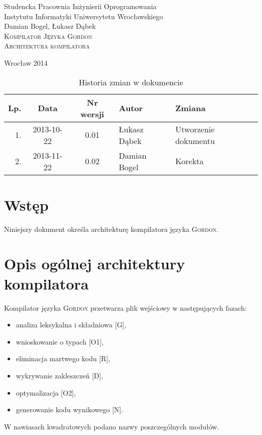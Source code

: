 \documentclass{documentation}
\begin{document}
\begin{titlepage}
\begin{center}
Studencka Pracownia Inżynierii Oprogramowania\\
Instytutu Informatyki Uniwersytetu Wrocławskiego\\[6cm]

Damian Bogel, Łukasz Dąbek\\[1cm]
\textsc{\LARGE Kompilator Języka Gordon}\\[0.5cm]
\textsc{\large Architektura kompilatora}

\vfill
Wrocław 2014 \\[2.5cm]

\end{center}
\end{titlepage}

\newpage
\begin{table}
	\centering
    \captionsetup{name=Tabela,labelsep=period,labelsep=period}
	\caption{Historia zmian w dokumencie}
		\begin{tabular}{|r|c|c|l|l|}
		\hline
		Lp.  & Data       & Nr wersji & Autor                 & Zmiana \\ \hline
		1.   & 2013-10-22 & 0.01 & Łukasz Dąbek & Utworzenie dokumentu \\ \hline
		2.   & 2013-11-22 & 0.02 & Damian Bogel & Korekta \\ \hline
	\end{tabular}
\end{table}
\newpage

\tableofcontents
\setcounter{page}{2}

\newpage

\section{Wstęp}
\noindent Niniejszy dokument określa architekturę kompilatora języka
\textsc{Gordon}.

\section{Opis ogólnej architektury kompilatora}
\noindent Kompilator języka \textsc{Gordon} przetwarza plik wejściowy w
następujących fazach:
\begin{itemize}
    \item analiza leksykalna i składniowa [G],
    \item wnioskowanie o typach [O1],
    \item eliminacja martwego kodu [R],
    \item wykrywanie zakleszczeń [D], 
    \item optymalizacja [O2],
    \item generowanie kodu wynikowego [N].
\end{itemize}
W nawiasach kwadratowych podano nazwy poszczególnych modułów.
\end{document}
